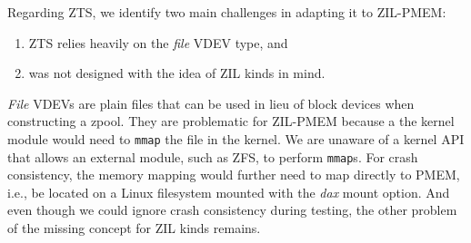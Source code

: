 \documentclass[12pt,a4paper,twoside]{book}
\begin{document}
Regarding ZTS, we identify two main challenges in adapting it to ZIL-PMEM:
\begin{enumerate}[noitemsep]
    \item ZTS relies heavily on the \textit{file} VDEV type, and
    \item was not designed with the idea of ZIL kinds in mind.
\end{enumerate}
\textit{File} VDEVs are plain files that can be used in lieu of block devices when constructing a zpool.
They are problematic for ZIL-PMEM because a the kernel module would need to \lstinline{mmap} the file in the kernel.
We are unaware of a kernel API that allows an external module, such as ZFS, to perform \lstinline{mmap}s.
For crash consistency, the memory mapping would further need to map directly to PMEM, i.e., be located on a Linux filesystem mounted with the \textit{dax} mount option.
And even though we could ignore crash consistency during testing, the other problem of the missing concept for ZIL kinds remains.
\end{document}
